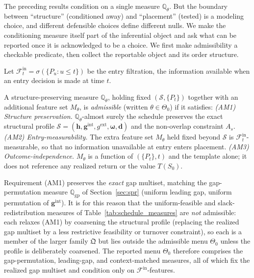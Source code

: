 \documentclass[risks,article,submit,pdftex,oneauthor]{Definitions/mdpi}
\begin{document}
The preceding results condition on a single measure $\mathbb{Q}_\theta$. But the
boundary between ``structure'' (conditioned away) and ``placement'' (tested) is a
modeling choice, and different defensible choices define different nulls. We make
the conditioning measure itself part of the inferential object and ask what can be
reported once it is acknowledged to be a choice. We first make admissibility a
checkable predicate, then collect the reportable object and its order structure.

Let $\mathcal F_t^{\mathrm{in}}=\sigma(\{P_u:u\le t\})$ be the entry filtration,
the information available when an entry decision is made at time $t$.

\begin{Definition}
\label{def:admissible}
A structure-preserving measure $\mathbb{Q}_\theta$, holding fixed
$(\mathcal S,\{P_t\})$ together with an additional feature set $M_\theta$, is
\emph{admissible} (written $\theta\in\Theta_0$) if it satisfies:
\emph{(AM1) Structure preservation.} $\mathbb{Q}_\theta$-almost surely the schedule
preserves the exact structural profile
$\mathcal S=(\mathbf h,\mathbf g^{\mathrm{int}},g^{\mathrm{ext}},\boldsymbol\omega,
\mathbf d)$ and the non-overlap constraint $A_s$.
\emph{(AM2) Entry-measurability.} The extra feature set $M_\theta$ held fixed beyond
$\mathcal S$ is $\mathcal F_t^{\mathrm{in}}$-measurable, so that no information
unavailable at entry enters placement.
\emph{(AM3) Outcome-independence.} $M_\theta$ is a function of $(\{P_t\},t)$ and the
template alone; it does not reference any realized return or the value $T(S_0)$.
\end{Definition}

Requirement (AM1) preserves the \emph{exact} gap multiset, matching the
gap-permutation measure $\mathbb{Q}_{\mathrm{gp}}$ of Section~\ref{sec:spr}
(uniform leading gap, uniform permutation of $\mathbf g^{\mathrm{int}}$). It is for
this reason that the uniform-feasible and slack-redistribution measures of
Table~\ref{tab:schedule_measures} are \emph{not} admissible: each relaxes (AM1) by
coarsening the structural profile (replacing the realized gap multiset by a less
restrictive feasibility or turnover constraint), so each is a member of the larger
family $\mathfrak Q$ but lies outside the admissible menu $\Theta_0$ unless the
profile is deliberately coarsened. The reported menu $\Theta_0$ therefore comprises
the gap-permutation, leading-gap, and context-matched measures, all of which fix
the realized gap multiset and condition only on $\mathcal F^{\mathrm{in}}$-features.
\end{document}

